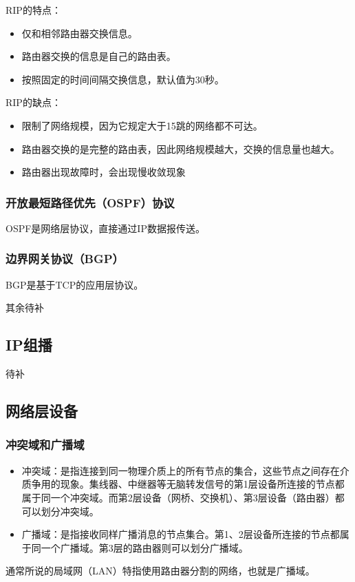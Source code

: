 \documentclass[12pt, a4paper, oneside]{ctexart}
\begin{document}
RIP的特点：
\begin{itemize}
    \item 仅和相邻路由器交换信息。
    \item 路由器交换的信息是自己的路由表。
    \item 按照固定的时间间隔交换信息，默认值为30秒。
\end{itemize}

RIP的缺点：
\begin{itemize}
    \item 限制了网络规模，因为它规定大于15跳的网络都不可达。
    \item 路由器交换的是完整的路由表，因此网络规模越大，交换的信息量也越大。
    \item 路由器出现故障时，会出现慢收敛现象
\end{itemize}

\subsubsection{开放最短路径优先（OSPF）协议}

OSPF是网络层协议，直接通过IP数据报传送。

\subsubsection{边界网关协议（BGP）}

BGP是基于TCP的应用层协议。

其余待补

\subsection{IP组播}

待补

\subsection{网络层设备}

\subsubsection{冲突域和广播域}

\begin{itemize}
    \item 冲突域：是指连接到同一物理介质上的所有节点的集合，这些节点之间存在介质争用的现象。集线器、中继器等无脑转发信号的第1层设备所连接的节点都属于同一个冲突域。而第2层设备（网桥、交换机）、第3层设备（路由器）都可以划分冲突域。
    \item 广播域：是指接收同样广播消息的节点集合。第1、2层设备所连接的节点都属于同一个广播域。第3层的路由器则可以划分广播域。
\end{itemize}
通常所说的局域网（LAN）特指使用路由器分割的网络，也就是广播域。
\end{document}
